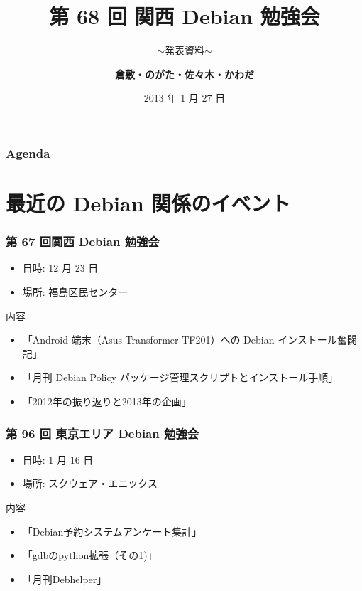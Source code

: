 \documentclass[cjk,dvipdfmx,10pt,compress,%
hyperref={bookmarks=true,bookmarksnumbered=true,bookmarksopen=false,%
colorlinks=false,%
pdftitle={第 68 回 関西 Debian 勉強会},%
pdfauthor={倉敷・のがた・佐々木・かわだ},%
pdfsubject={資料},%
}]{beamer}
\title{第 68 回 関西 Debian 勉強会}
\subtitle{$\sim$発表資料$\sim$}
\author[かわだ てつたろう]{{\large\bf 倉敷・のがた・佐々木・かわだ}}
\institute[Debian JP]{{\normalsize\tt 関西 Debian 勉強会}}
\date{{\small 2013 年 1 月 27 日}}
\begin{document}
\settitleslide
\begin{frame}
\titlepage
\end{frame}
\setdefaultslide

\begin{frame}[fragile]
\frametitle{Agenda}

\tableofcontents

\end{frame}

\section{最近の Debian 関係のイベント}


\begin{frame}[fragile]
  \frametitle{第 67 回関西 Debian 勉強会}
  \begin{itemize}
  \item 日時: 12 月 23 日
  \item 場所: 福島区民センター
  \end{itemize}
  \begin{block}{内容}
    \begin{itemize}
    \item「Android 端末（Asus Transformer TF201）への Debian インストール奮闘記」
    \item 「月刊 Debian Policy パッケージ管理スクリプトとインストール手順」
    \item 「2012年の振り返りと2013年の企画」
    \end{itemize}
  \end{block}
\end{frame}

\begin{frame}[fragile]
  \frametitle{第 96 回 東京エリア Debian 勉強会}
  \begin{itemize}
  \item 日時: 1 月 16 日
  \item 場所: スクウェア・エニックス
  \end{itemize}
  \begin{block}{内容}
    \begin{itemize}
    \item 「Debian予約システムアンケート集計」
    \item 「gdbのpython拡張（その1)」
    \item 「月刊Debhelper」
    \end{itemize}
  \end{block}
\end{frame}
\end{document}
